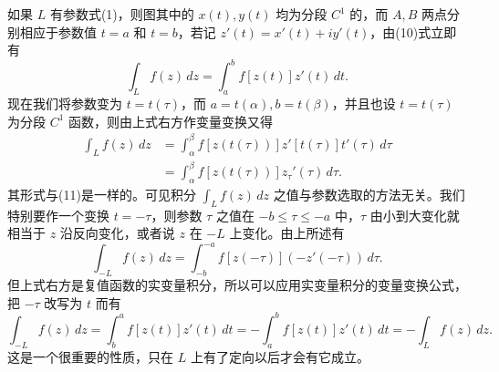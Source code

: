 如果 $L$ 有参数式(1)，则图其中的 $x(t),y(t)$ 均为分段 $C^1$ 的，而 $A,B$ 两点分别相应于参数值 $t=a$ 和 $t=b$，若记 $z'(t)=x'(t)+iy'(t)$，由(10)式立即有
\begin{equation}
 \int_L f(z)\,dz=\int_a^b f[z(t)]z'(t)\,dt.
 \tag{11}
\end{equation}
现在我们将参数变为 $t=t(\tau)$，而 $a=t(\alpha),b=t(\beta)$，并且也设 $t=t(\tau)$ 为分段 $C^1$ 函数，则由上式右方作变量变换又得
\[
\begin{aligned}
 \int_Lf(z)\,dz
 &=\int_\alpha^\beta f[z(t(\tau))]z'[t(\tau)]t'(\tau)\,d\tau\\
 &=\int_\alpha^\beta f[z(t(\tau))]z_\tau'(\tau)\,d\tau.
\end{aligned}
\]
其形式与(11)是一样的。可见积分 $\int_Lf(z)\,dz$ 之值与参数选取的方法无关。我们特别要作一个变换 $t=-\tau$，则参数 $\tau$ 之值在 $-b\le\tau\le-a$ 中，$\tau$ 由小到大变化就相当于 $z$ 沿反向变化，或者说 $z$ 在 $-L$ 上变化。由上所述有
\[
 \int_{-L}f(z)\,dz
 =\int_{-b}^{-a}f[z(-\tau)](-z'(-\tau))\,d\tau.
\]
但上式右方是复值函数的实变量积分，所以可以应用实变量积分的变量变换公式，把 $-\tau$ 改写为 $t$ 而有
\begin{equation}
 \int_{-L}f(z)\,dz
 =\int_b^a f[z(t)]z'(t)\,dt
 =-\int_a^b f[z(t)]z'(t)\,dt
 =-\int_Lf(z)\,dz.
 \tag{12}
\end{equation}
这是一个很重要的性质，只在 $L$ 上有了定向以后才会有它成立。

